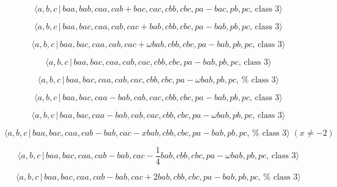 \documentclass[10pt]{article}
\begin{document}
\begin{equation}
\langle a,b,c\,|\,baa,bab,caa,cab+bac,cac,cbb,cbc,pa-bac,pb,pc,\,\text{class 
}3\rangle  \tag{7.1189}
\end{equation}

\begin{equation}
\langle a,b,c\,|\,baa,bac,caa,cab,cac+bab,cbb,cbc,pa-bab,pb,pc,\,\text{class 
}3\rangle  \tag{7.1190}
\end{equation}

\begin{equation}
\langle a,b,c\,|\,baa,bac,caa,cab,cac+\omega bab,cbb,cbc,pa-bab,pb,pc,\,%
\text{class }3\rangle  \tag{7.1191}
\end{equation}

\begin{equation}
\langle a,b,c\,|\,baa,bac,caa,cab,cac,cbb,cbc,pa-bab,pb,pc,\,\text{class }%
3\rangle  \tag{7.1192}
\end{equation}

\begin{equation}
\langle a,b,c\,|\,baa,bac,caa,cab,cac,cbb,cbc,pa-\omega bab,pb,pc,\,\text{%
class }3\rangle  \tag{7.1193}
\end{equation}

\begin{equation}
\langle a,b,c\,|\,baa,bac,caa-bab,cab,cac,cbb,cbc,pa-bab,pb,pc,\,\text{class 
}3\rangle  \tag{7.1194}
\end{equation}

\begin{equation}
\langle a,b,c\,|\,baa,bac,caa-bab,cab,cac,cbb,cbc,pa-\omega bab,pb,pc,\,%
\text{class }3\rangle  \tag{7.1195}
\end{equation}

\begin{equation}
\langle a,b,c\,|\,baa,bac,caa,cab-bab,cac-xbab,cbb,cbc,pa-bab,pb,pc,\,\text{%
class }3\rangle \;(x \neq -2)  \tag{7.1196}
\end{equation}

\begin{equation}
\langle a,b,c\,|\,baa,bac,caa,cab-bab,cac-\frac{1}{4}bab,cbb,cbc,pa-\omega
bab,pb,pc,\,\text{class }3\rangle  \tag{7.1197}
\end{equation}

\begin{equation}
\langle a,b,c\,|\,baa,bac,caa,cab-bab,cac+2bab,cbb,cbc,pa-bab,pb,pc,\,\text{%
class }3\rangle  \tag{7.1198}
\end{equation}
\end{document}
